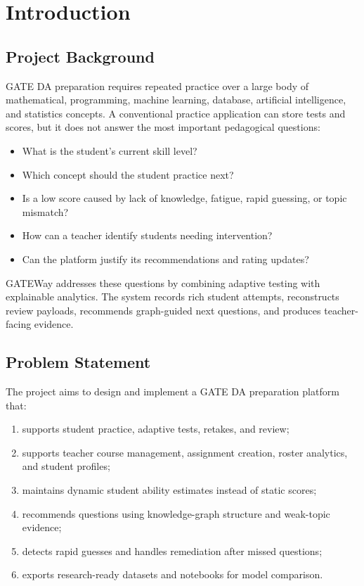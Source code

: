 \documentclass[12pt,a4paper]{report}
\begin{document}
\tableofcontents
\listoffigures
\listoftables
\clearpage
{}

\chapter{Introduction}
\section{Project Background}
GATE DA preparation requires repeated practice over a large body of mathematical, programming, machine learning, database, artificial intelligence, and statistics concepts. A conventional practice application can store tests and scores, but it does not answer the most important pedagogical questions:

\begin{itemize}[leftmargin=*]
  \item What is the student's current skill level?
  \item Which concept should the student practice next?
  \item Is a low score caused by lack of knowledge, fatigue, rapid guessing, or topic mismatch?
  \item How can a teacher identify students needing intervention?
  \item Can the platform justify its recommendations and rating updates?
\end{itemize}

GATEWay addresses these questions by combining adaptive testing with explainable analytics. The system records rich student attempts, reconstructs review payloads, recommends graph-guided next questions, and produces teacher-facing evidence.

\section{Problem Statement}
The project aims to design and implement a GATE DA preparation platform that:

\begin{enumerate}[leftmargin=*]
  \item supports student practice, adaptive tests, retakes, and review;
  \item supports teacher course management, assignment creation, roster analytics, and student profiles;
  \item maintains dynamic student ability estimates instead of static scores;
  \item recommends questions using knowledge-graph structure and weak-topic evidence;
  \item detects rapid guesses and handles remediation after missed questions;
  \item exports research-ready datasets and notebooks for model comparison.
\end{enumerate}
\end{document}
